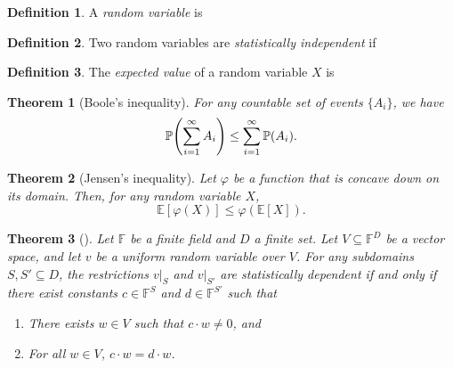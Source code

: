\documentclass[english,12pt]{reedthesis}
\theoremstyle{plain}
\newtheorem{thm}{Theorem}[section]
\theoremstyle{definition}
\newtheorem{defn}[defn]{Definition}
\theoremstyle{remark}
\begin{document}
\begin{defn}\label{def:random-var}
  A \emph{random variable} is %
\end{defn}

\begin{defn}\label{def:stat-indep}
  Two random variables are \emph{statistically independent} if
\end{defn}

\begin{defn}\label{def:expected-val}
  The \emph{expected value} of a random variable $X$ is
\end{defn}


\begin{thm}[{Boole's inequality}]\label{thm:boole-inequality}
  For any countable set of events $\{A_{i}\}$, we have
  \begin{equation}
    \mathbb{P}\mleft(\sum_{i=1}^{\infty}A_{i}\mright) \le \sum_{i=1}^{\infty}\mathbb{P}(A_{i}).
  \end{equation}
\end{thm}

\begin{thm}[{Jensen's inequality}]\label{thm:jensen-inequality}
  Let $\varphi$ be a function that is concave down on its domain. Then, for any random
  variable $X$,
  \begin{equation}\label{eqn:jensen-inequality}
    \mathbb{E}[\varphi(X)] \le \varphi(\mathbb{E}[X]).
  \end{equation}
\end{thm}


\begin{thm}[{\cite[Claim 2]{CFGS22}}]\label{thm:lin-indep-stat-indep}
  Let $\mathbb{F}$ be a finite field and $D$ a finite set. Let
  $V \subseteq \mathbb{F}^{D}$ be a vector space, and let $v$ be a uniform random
  variable over $V$. For any subdomains $S, S' \subseteq D$, the restrictions $v|_{S}$
  and $v|_{S'}$ are statistically dependent if and only if there exist constants
  $c \in \mathbb{F}^{S}$ and $d \in \mathbb{F}^{S'}$ such that
  \begin{enumerate}
    \item There exists $w \in V$ such that $c \cdot w \ne 0$, and
    \item For all $w \in V$, $c \cdot w = d \cdot w$.
  \end{enumerate}
\end{thm}
\end{document}
